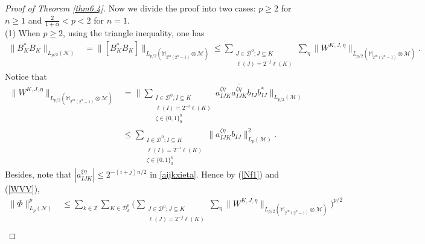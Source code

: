 \documentclass[oneside,english,a4wide]{amsart}
\numberwithin{equation}{section}
\numberwithin{figure}{section}
\theoremstyle{plain}
\theoremstyle{plain}
\theoremstyle{definition}
\theoremstyle{plain}
\theoremstyle{remark}
\theoremstyle{definition}
\theoremstyle{remark}
\theoremstyle{definition}
\newcommand{\8}{\infty}
\begin{document}
\begin{proof}[Proof of Theorem \ref{thm6.4}]
	Now we divide the proof into two cases: $p\geq 2$ for $n\geq 1$ and $\frac{2}{1+\alpha}< p<2$ for $n=1$.\\
	(1) When $p\geq 2$, using the triangle inequality, one has
	\begin{equation*}
		\begin{aligned}
			\|B^*_KB_K\|_{L_{p/2}(\mathcal{N})}{}&=\|[B_K^*B_K]\|_{L_{p/2}(\mathbb{M}_{2^{in}(2^n-1)}\otimes\mathcal{M})}\le \sum_{\substack{J\in\mathcal{D}^0;J\subseteq K\\ \ell(J)=2^{-j}\ell(K)}}\sum_{\eta}\big\|W^{K,J,\eta}\big\|_{L_{p/2}(\mathbb{M}_{2^{in}(2^n-1)}\otimes\mathcal{M})}.
		\end{aligned}
	\end{equation*}
Notice that
\begin{equation}\label{WVV}
	\begin{aligned}
		\big\|W^{K,J,\eta}\big\|_{L_{p/2}(\mathbb{M}_{2^{in}(2^n-1)}\otimes\mathcal{M})}{}
		&=\bigg\|\sum_{\substack{{I}\in\mathcal{D}^0;{I}\subseteq K \\ \ell({I})=2^{-i}\ell(K)\\ {\zeta}\in\{0,1\}^n_0}}a_{{I}JK}^{{\zeta}\eta}\overline{a_{{I}JK}^{{\zeta}\eta}}b_{{I}J}b_{{I}J}^* \bigg\|_{L_{p/2}(\mathcal{M})}\\
		&\le\sum_{\substack{{I}\in\mathcal{D}^0;{I}\subseteq K \\ \ell({I})=2^{-i}\ell(K)\\ {\zeta}\in\{0,1\}^n_0}}\Big\|a_{{I}JK}^{{\zeta}\eta} b_{{I}J}\Big\|_{L_{p}(\mathcal{M})}^2.
	\end{aligned}
\end{equation}
Besides, note that
$|a_{IJK}^{\xi\eta}|\le 2^{-(i+j)n/2}$ in \eqref{aijkxieta}. Hence by (\ref{Nf1}) and (\ref{WVV}),
\begin{equation}\label{Nf}
	\begin{aligned}
		\|\varPhi\|_{L_p(\mathcal{N})}^p{}&\le \sum_{k\in\mathbb{Z}}\sum_{K\in\mathcal{D}^0_k}\biggl(\sum_{\substack{J\in\mathcal{D}^0;J\subseteq K\\ \ell(J)=2^{-j}\ell(K)}}\sum_{\eta}\big\|W^{K,J,\eta}\big\|_{L_{p/2}(\mathbb{M}_{2^{in}(2^n-1)}\otimes\mathcal{M})}\biggr)^{p/2}\\

\end{aligned}
\end{equation}
\end{proof}
\end{document}
